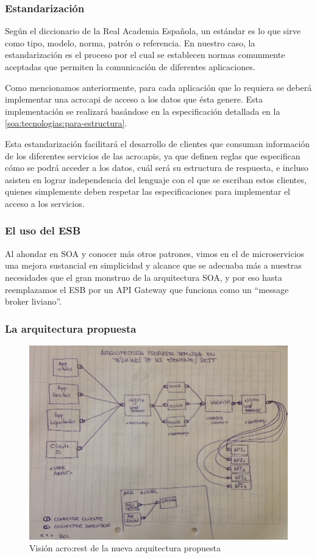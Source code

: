 \subsubsection{Estandarización}

Según el diccionario de la Real Academia Española, un estándar es lo que sirve como tipo, modelo, norma, patrón o referencia. En nuestro caso, la estandarización es el proceso por el cual se establecen normas comunmente aceptadas que permiten la comunicación de diferentes aplicaciones.

Como mencionamos anteriormente, para cada aplicación que lo requiera se deberá implementar una \gls{acro:api} de acceso a los datos que ésta genere. Esta implementación se realizará basándose en la especificación  detallada en la \autoref{soa:tecnologias:para-estructura}.

Esta estandarización facilitará el desarrollo de clientes que consuman información de los diferentes servicios de las \glspl{acro:api}, ya que definen reglas que especifican cómo se podrá acceder a los datos, cuál será su estructura de respuesta, e incluso asisten en lograr independencia del lenguaje con el que se escriban estos clientes, quienes simplemente deben respetar las especificaciones para implementar el acceso a los servicios.

\subsubsection{El uso del ESB}


Al ahondar en SOA y conocer más otros patrones, vimos en el de microservicios una mejora sustancial en simplicidad y alcance que se adecuaba más a nuestras necesidades que el gran monstruo de la arquitectura SOA, y por eso hasta reemplazamos el ESB por un API Gateway que funciona como un ``message broker liviano''.


\subsubsection{La arquitectura propuesta}


\begin{figure}
  \includegraphics[width=\linewidth]{src/images/04-capitulo-4/nueva-arq-segun-rest.jpg}
  \caption{Visión \gls{acro:rest} de la nueva arquitectura propuesta}
  \label{fig:ejemplo-rest-nueva-arquitectura}
\end{figure}
